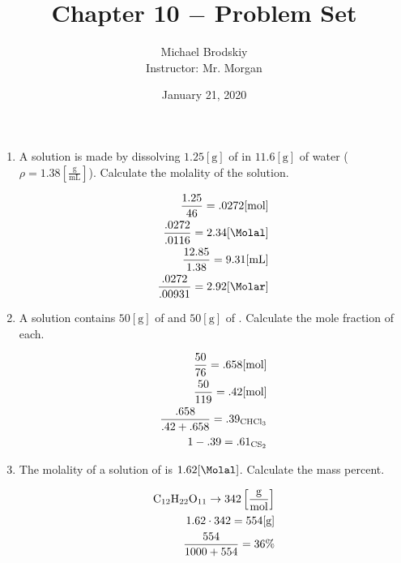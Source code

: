 \documentclass[12pt]{article}
\title{Chapter 10 $-$ Problem Set}
\date{January 21, 2020}
\author{Michael Brodskiy\\ \small Instructor: Mr. Morgan}
\begin{document}
\maketitle

\begin{enumerate}

  \item A solution is made by dissolving $1.25[\si{\gram}]$ of  in $11.6[\si{\gram}]$ of water ($\rho=1.38\left[ \frac{\si{\gram}}{\si{\milli\liter}} \right]$).  Calculate the molality of the solution.

    \begin{equation}
      \begin{split}
        \frac{1.25}{46}=.0272[\si{\mole}]\\
        \frac{.0272}{.0116}=2.34[\si{\Molal}]\\
        \frac{12.85}{1.38}=9.31[\si{\milli\liter}]\\
        \frac{.0272}{.00931}=2.92[\si{\Molar}]\\
      \end{split}
      \label{1}
    \end{equation}

  \item A solution contains $50[\si{\gram}]$ of  and $50[\si{\gram}]$ of .  Calculate the mole fraction of each.

    \begin{equation}
      \begin{split}
        \frac{50}{76}=.658[\si{\mole}]\\
        \frac{50}{119}=.42[\si{\mole}]\\
        \frac{.658}{.42+.658}=.39_{\ce{CHCl3}}\\
        1-.39=.61_{\ce{CS2}}\\
      \end{split}
      \label{2}
    \end{equation}

  \item The molality of a solution of  is $1.62[\si{\Molal}]$.  Calculate the mass percent.

    \begin{equation}
      \begin{split}
        \ce{C12H22O11} \rightarrow 342\left[ \frac{\si{\gram}}{\si{\mole}} \right]\\
        1.62\cdot342=554[\si{\gram}]\\
        \frac{554}{1000+554}=36\%
      \end{split}
      \label{3}
    \end{equation}


\end{enumerate}
\end{document}
